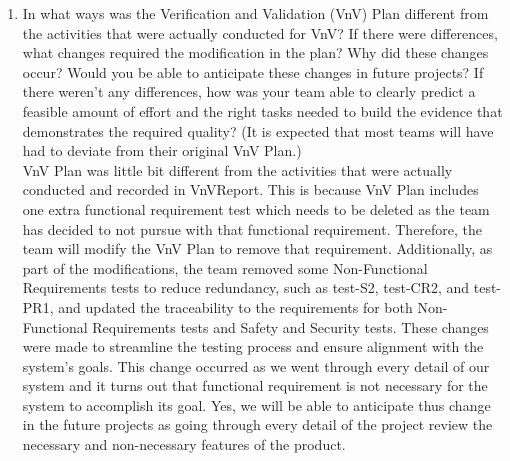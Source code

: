 \documentclass[12pt, titlepage]{article}
\begin{document}
\begin{enumerate}
  \item In what ways was the Verification and Validation (VnV) Plan different
  from the activities that were actually conducted for VnV?  If there were
  differences, what changes required the modification in the plan?  Why did
  these changes occur?  Would you be able to anticipate these changes in future
  projects?  If there weren't any differences, how was your team able to clearly
  predict a feasible amount of effort and the right tasks needed to build the
  evidence that demonstrates the required quality?  (It is expected that most
  teams will have had to deviate from their original VnV Plan.)\\
  VnV Plan was little bit different from the activities that were actually conducted and recorded in VnVReport. This is because VnV Plan includes one extra functional requirement test which needs to be deleted as the team has decided to not pursue with that functional requirement. Therefore, the team will modify the VnV Plan to remove that requirement. Additionally, as part of the modifications, the team removed some Non-Functional Requirements tests to reduce redundancy, such as test-S2, test-CR2, and test-PR1, and updated the traceability to the requirements for both Non-Functional Requirements tests and Safety and Security tests. These changes were made to streamline the testing process and ensure alignment with the system's goals. This change occurred as we went through every detail of our system and it turns out that functional requirement is not necessary for the system to accomplish its goal. Yes, we will be able to anticipate thus change in the future projects as going through every detail of the project review the necessary and non-necessary features of the product.  

\end{enumerate}
\end{document}
